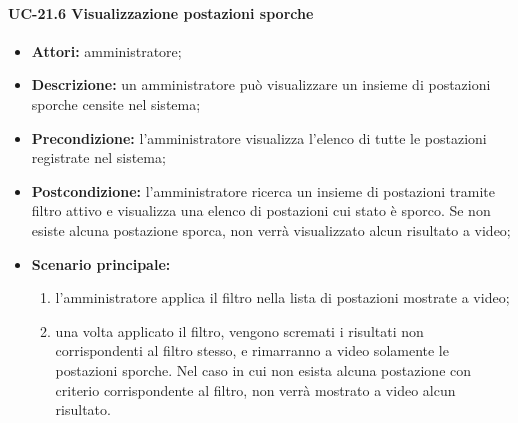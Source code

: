 \paragraph{UC-21.6 Visualizzazione postazioni sporche}
\begin{itemize}
    \item \textbf{Attori:} amministratore;
    \item \textbf{Descrizione:} un amministratore pu\`{o} visualizzare un insieme di postazioni sporche censite nel sistema;
    \item \textbf{Precondizione:} l'amministratore visualizza l'elenco di tutte le postazioni registrate nel sistema;
    \item \textbf{Postcondizione:} l'amministratore ricerca un insieme di postazioni tramite filtro attivo e visualizza una elenco di postazioni cui stato è sporco. Se non esiste alcuna postazione sporca, non verrà visualizzato alcun risultato a video;
    \item \textbf{Scenario principale:}
    \begin{enumerate}
        \item l'amministratore applica il filtro nella lista di postazioni mostrate a video;
        \item una volta applicato il filtro, vengono scremati i risultati non corrispondenti al filtro stesso, e rimarranno a video solamente le postazioni sporche. Nel caso in cui non esista alcuna postazione con criterio corrispondente al filtro, non verrà mostrato a video alcun risultato.
    \end{enumerate}
\end{itemize}


